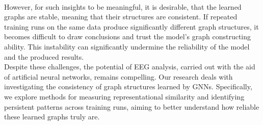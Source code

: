 \vspace{0.5em}\\
However, for such insights to be meaningful, it is desirable, that the learned graphs are stable, meaning that their structures are consistent. If repeated training runs on the same data produce significantly different graph structures, it becomes difficult to draw conclusions and trust the model’s graph constructing ability. This instability can significantly undermine the reliability of the model and the produced results.
\vspace{0.5em}\\
Despite these challenges, the potential of EEG analysis, carried out with the aid of artificial neural networks, remains compelling. Our research deals with investigating the consistency of graph structures learned by GNNs. Specifically, we explore methods for measuring representational similarity and identifying persistent patterns across training runs, aiming to better understand how reliable these learned graphs truly are. 